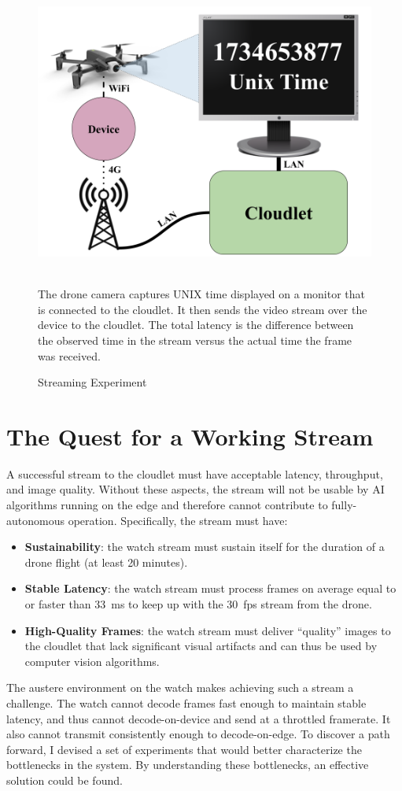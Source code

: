 \begin{figure}
    \centering
    \includegraphics[width=0.75\linewidth]{chapter3/FIGS/mtp-experiment.png}
    \begin{captext}
    \\ \small The drone camera captures UNIX time displayed on a monitor that is connected to the cloudlet. It then sends the video stream over the device to the cloudlet. The total latency is the difference between the observed time in the stream versus the actual time the frame was received.
    \end{captext}
    \caption{Streaming Experiment}
    \label{fig:streaming-experiment}
\end{figure}

\section{The Quest for a Working Stream}
\label{sec:quest-working-stream}
A successful stream to the cloudlet must have acceptable latency, throughput, and image quality. Without these aspects, the stream will not be usable by AI algorithms running on the edge and therefore cannot contribute to fully-autonomous operation. Specifically, the stream must have:
\begin{itemize}
    \item \textbf{Sustainability}: the watch stream must sustain itself for the duration of a drone flight (at least 20 minutes).
    \item \textbf{Stable Latency}: the watch stream must process frames on average equal to or faster than 33~ms to keep up with the 30~fps stream from the drone.
    \item \textbf{High-Quality Frames}: the watch stream must deliver ``quality'' images to the cloudlet that lack significant visual artifacts and can thus be used by computer vision algorithms.
\end{itemize}
The austere environment on the watch makes achieving such a stream a challenge. The watch cannot decode frames fast enough to maintain stable latency, and thus cannot decode-on-device and send at a throttled framerate. It also cannot transmit consistently enough to decode-on-edge. To discover a path forward, I devised a set of experiments that would better characterize the bottlenecks in the system. By understanding these bottlenecks, an effective solution could be found.

